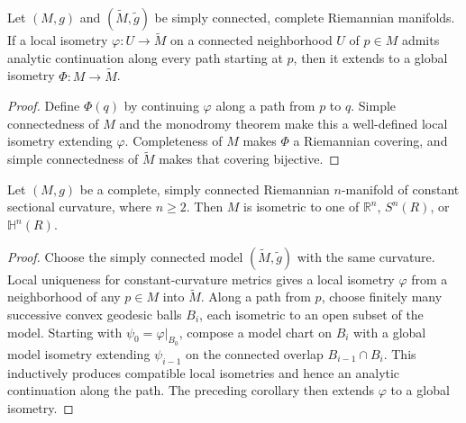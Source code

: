 \begin{corollary}
\label{cor:global-isometry-from-local-simply-connected}
Let $(M,g)$ and $(\widetilde M,\widetilde g)$ be simply connected, complete
Riemannian manifolds.  If a local isometry $\varphi:U\to\widetilde M$ on a
connected neighborhood $U$ of $p\in M$ admits analytic continuation along
every path starting at $p$, then it extends to a global isometry
$\Phi:M\to\widetilde M$.
\begin{proof}
\sketch Define $\Phi(q)$ by continuing $\varphi$ along a path from $p$ to
$q$.  Simple connectedness of $M$ and the monodromy theorem make this a
well-defined local isometry extending $\varphi$.  Completeness of $M$ makes
$\Phi$ a Riemannian covering, and simple connectedness of $\widetilde M$ makes
that covering bijective.
\end{proof}
\end{corollary}

\begin{theorem}
\label{thm:killing-hopf}
Let $(M,g)$ be a complete, simply connected Riemannian $n$-manifold of
constant sectional curvature, where $n\geq2$.  Then $M$ is isometric to one
of $\mathbb R^n$, $S^n(R)$, or $\mathbb H^n(R)$.
\begin{proof}
\sketch Choose the simply connected model $(\widetilde M,\widetilde g)$ with
the same curvature.  Local uniqueness for constant-curvature metrics gives a
local isometry $\varphi$ from a neighborhood of any $p\in M$ into
$\widetilde M$.  Along a path from $p$, choose finitely many successive convex
geodesic balls $B_i$, each isometric to an open subset of the model.  Starting
with $\psi_0=\varphi|_{B_0}$, compose a model chart on $B_i$ with a global
model isometry extending $\psi_{i-1}$ on the connected overlap
$B_{i-1}\cap B_i$.  This inductively produces compatible local isometries and
hence an analytic continuation along the path.  The preceding corollary then
extends $\varphi$ to a global isometry.
\end{proof}
\end{theorem}

